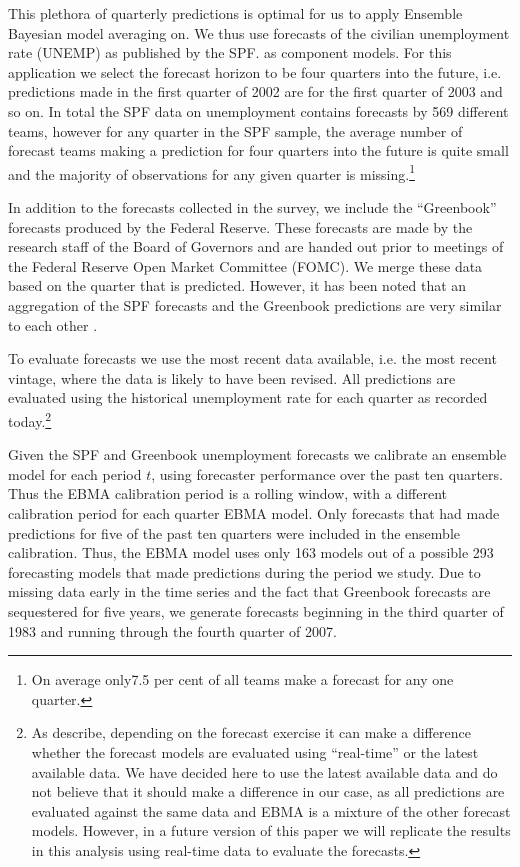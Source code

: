 \documentclass[12pt,fullpage,endnotes]{article}
\begin{document}
This plethora of quarterly predictions is optimal for us to apply Ensemble Bayesian model averaging on. We thus use forecasts of the civilian unemployment rate (UNEMP) as published by the SPF. as component models. For this application we select the forecast horizon to be four quarters into the future, i.e. predictions made in the first quarter of 2002 are for the first quarter of 2003 and so on. In total the SPF data on unemployment contains forecasts by 569 different teams, however for any quarter in the SPF sample, the average number of forecast teams making a prediction for four quarters into the future is quite small and the majority of observations for any given quarter is missing.\footnote{On average only7.5 per cent of all teams make a forecast for any one quarter.}

In addition to the forecasts collected in the survey, we include the ``Greenbook'' forecasts produced by the Federal Reserve. These forecasts are made by the research staff of the Board of Governors and are handed out prior to meetings of the Federal Reserve Open Market Committee (FOMC). We merge these data based on the quarter that is predicted. However, it has been noted that an aggregation of the SPF forecasts and the Greenbook predictions are very similar to each other \citep{Baghestani:2008}. 

To evaluate forecasts we use the most recent data available, i.e. the most recent vintage, where the data is likely to have been revised. All predictions are evaluated using the historical unemployment rate for each quarter as recorded today.\footnote{As \citet{Croushore:Stark:2001} describe, depending on the forecast exercise it can make a difference whether the forecast models are evaluated using ``real-time'' or the latest available data. We have decided here to use the latest available data and do not believe that it should make a difference in our case, as all predictions are evaluated against the same data and EBMA is a mixture of the other forecast models. However, in a future version of this paper we will replicate the results in this analysis using real-time data to evaluate the forecasts.}

Given the SPF and Greenbook unemployment forecasts we calibrate an ensemble model for each period $t$, using forecaster
performance over the past ten quarters. Thus the EBMA calibration period is a rolling window, with a different calibration period for each quarter EBMA model. Only forecasts that had made
predictions for five of the past ten quarters were included in the ensemble calibration.
Thus, the EBMA model uses only 163 models out of a possible 293
forecasting models that made predictions during the period we study.
Due to missing data early in the time series and the fact that Greenbook forecasts are
sequestered for five years, we generate forecasts beginning in the
third quarter of 1983 and running through the fourth quarter of 2007.
\end{document}
